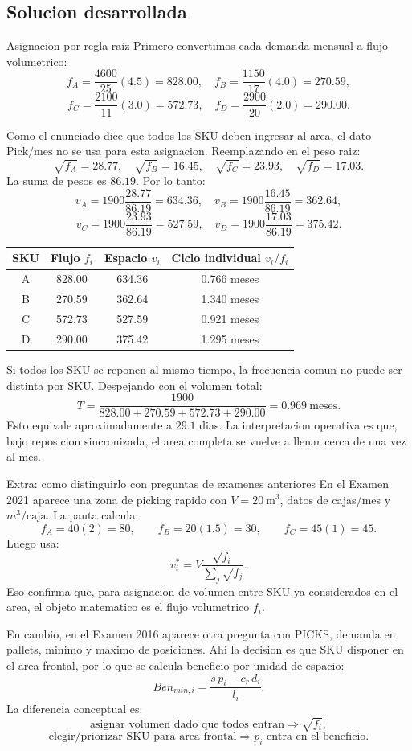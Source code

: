\subsection{Solucion desarrollada}

\begin{respuesta}{Asignacion por regla raiz}
Primero convertimos cada demanda mensual a flujo volumetrico:
\[
f_A=\frac{4600}{25}(4.5)=828.00,\quad
f_B=\frac{1150}{17}(4.0)=270.59,
\]
\[
f_C=\frac{2100}{11}(3.0)=572.73,\quad
f_D=\frac{2900}{20}(2.0)=290.00.
\]

Como el enunciado dice que todos los SKU deben ingresar al area, el dato \(\text{Pick/mes}\) no se usa para esta asignacion. Reemplazando en el peso raiz:
\[
\sqrt{f_A}=28.77,\quad
\sqrt{f_B}=16.45,\quad
\sqrt{f_C}=23.93,\quad
\sqrt{f_D}=17.03.
\]
La suma de pesos es \(86.19\). Por lo tanto:
\[
v_A=1900\frac{28.77}{86.19}=634.36,
\quad
v_B=1900\frac{16.45}{86.19}=362.64,
\]
\[
v_C=1900\frac{23.93}{86.19}=527.59,
\quad
v_D=1900\frac{17.03}{86.19}=375.42.
\]

\begin{center}
\begin{tabular}{cccc}
\toprule
SKU & Flujo \(f_i\) & Espacio \(v_i\) & Ciclo individual \(v_i/f_i\) \\
\midrule
A & 828.00 & 634.36 & 0.766 meses \\
B & 270.59 & 362.64 & 1.340 meses \\
C & 572.73 & 527.59 & 0.921 meses \\
D & 290.00 & 375.42 & 1.295 meses \\
\bottomrule
\end{tabular}
\end{center}

Si todos los SKU se reponen al mismo tiempo, la frecuencia comun no puede ser distinta por SKU. Despejando con el volumen total:
\[
T=\frac{1900}{828.00+270.59+572.73+290.00}=0.969\ \text{meses}.
\]
Esto equivale aproximadamente a \(29.1\) dias. La interpretacion operativa es que, bajo reposicion sincronizada, el area completa se vuelve a llenar cerca de una vez al mes.
\end{respuesta}

\begin{respuesta}{Extra: como distinguirlo con preguntas de examenes anteriores}
En el Examen 2021 aparece una zona de picking rapido con \(V=20\ \text{m}^3\), datos de cajas/mes y \(m^3/\text{caja}\). La pauta calcula:
\[
f_A=40(2)=80,\qquad f_B=20(1.5)=30,\qquad f_C=45(1)=45.
\]
Luego usa:
\[
v_i^*=V\frac{\sqrt{f_i}}{\sum_j\sqrt{f_j}}.
\]
Eso confirma que, para asignacion de volumen entre SKU ya considerados en el area, el objeto matematico es el flujo volumetrico \(f_i\).

En cambio, en el Examen 2016 aparece otra pregunta con \(\text{PICKS}\), demanda en pallets, minimo y maximo de posiciones. Ahi la decision es que SKU disponer en el area frontal, por lo que se calcula beneficio por unidad de espacio:
\[
Ben_{min,i}=\frac{s\,p_i-c_r\,d_i}{l_i}.
\]
La diferencia conceptual es:
\[
\text{asignar volumen dado que todos entran}\Rightarrow \sqrt{f_i},
\]
\[
\text{elegir/priorizar SKU para area frontal}\Rightarrow p_i \text{ entra en el beneficio}.
\]
\end{respuesta}
